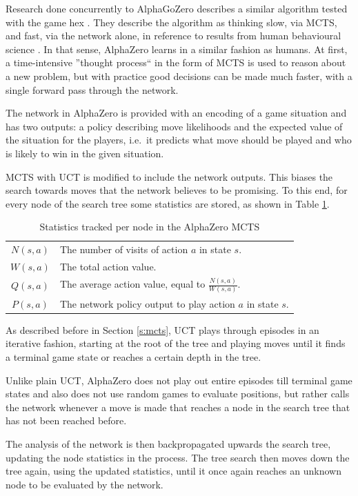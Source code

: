 \documentclass[12pt,onecolumn,oneside,titlepage]{article}
\begin{document}
Research done concurrently to AlphaGoZero describes a similar algorithm tested with the game hex \cite{anthony2017thinking}. 
They describe the algorithm as thinking slow, via MCTS, and fast, via the network alone, in reference to results from human behavioural science \cite{kahneman2011thinking}.
In that sense, AlphaZero learns in a similar fashion as humans. At first, a time-intensive ''thought process`` in the form of MCTS is used to reason about a new problem,
but with practice good decisions can be made much faster, with a single forward pass through the network.

The network in AlphaZero is provided with an encoding of a game situation and has two outputs: 
a policy describing move likelihoods and the expected value of the situation for the players, i.e.\ it predicts what move should be played and who is likely to win in the given situation.

MCTS with UCT is modified to include the network outputs. This biases the search towards moves that the network believes to be promising.
To this end, for every node of the search tree some statistics are stored, as shown in Table \ref{t:mcts_stats_values}.

\begin{table} [H]
 \centering
  \begin{tabular}{ c l }
  $N(s,a)$ & The number of visits of action $a$ in state $s$. \\ 
  $W(s,a)$ & The total action value. \\  
  $Q(s, a)$ & The average action value, equal to $\frac{N(s,a)}{W(s,a)}$. \\
  $P(s,a)$ & The network policy output to play action $a$ in state $s$.
  \end{tabular}
  \caption{Statistics tracked per node in the AlphaZero MCTS}
  \label{t:mcts_stats_values}
\end{table}

As described before in Section \ref{s:mcts}, UCT plays through episodes in an iterative fashion, starting at the root of the tree and playing moves until it finds a terminal game state or reaches a certain depth in the tree.

Unlike plain UCT, AlphaZero does not play out entire episodes till terminal game states 
and also does not use random games to evaluate positions, but rather calls the network whenever a move is made that reaches a node in the search tree that has not been reached before.

The analysis of the network is then backpropagated upwards the search tree, updating the node statistics in the process. 
The tree search then moves down the tree again, using the updated statistics, until it once again reaches an unknown node to be evaluated by the network.
\end{document}

